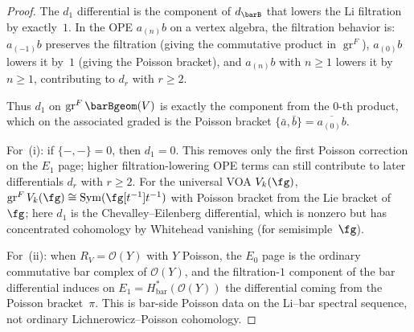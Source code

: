 \begin{proof}
The $d_1$ differential is the component of $d_{\barB}$ that
lowers the Li filtration by exactly~$1$. In the OPE
$a_{(n)} b$ on a vertex algebra, the filtration behavior is:
$a_{(-1)} b$ preserves the filtration (giving the commutative
product in $\operatorname{gr}^F$), $a_{(0)} b$ lowers it
by~$1$ (giving the Poisson bracket), and $a_{(n)} b$ with
$n \geq 1$ lowers it by $n \geq 1$, contributing to
$d_r$ with $r \geq 2$.

Thus $d_1$ on $\operatorname{gr}^F \barBgeom(V)$ is exactly the
component from the $0$-th product, which on the associated
graded is the Poisson bracket
$\{\bar{a}, \bar{b}\} = \overline{a_{(0)} b}$.

For~(i): if $\{-,-\} = 0$, then $d_1 = 0$.
This removes only the first Poisson correction on the
$E_1$ page; higher filtration-lowering OPE terms can still
contribute to later differentials $d_r$ with $r \geq 2$.
For the universal VOA $V_k(\fg)$,
$\operatorname{gr}^F V_k(\fg) \cong
\operatorname{Sym}(\fg[t^{-1}]t^{-1})$ with
Poisson bracket from the Lie bracket of~$\fg$;
here $d_1$ is the Chevalley--Eilenberg differential,
which is nonzero but has concentrated cohomology
by Whitehead vanishing \textup{(}for semisimple~$\fg$\textup{)}.

For~(ii): when $R_V = \mathcal{O}(Y)$ with $Y$ Poisson, the
$E_0$ page is the ordinary commutative bar complex of
$\mathcal{O}(Y)$, and the filtration-$1$ component of the bar
differential induces on
$E_1 = H^*_{\mathrm{bar}}(\mathcal{O}(Y))$ the differential
coming from the Poisson bracket~$\pi$. This is bar-side
Poisson data on the Li--bar spectral sequence, not ordinary
Lichnerowicz--Poisson cohomology.
\end{proof}

